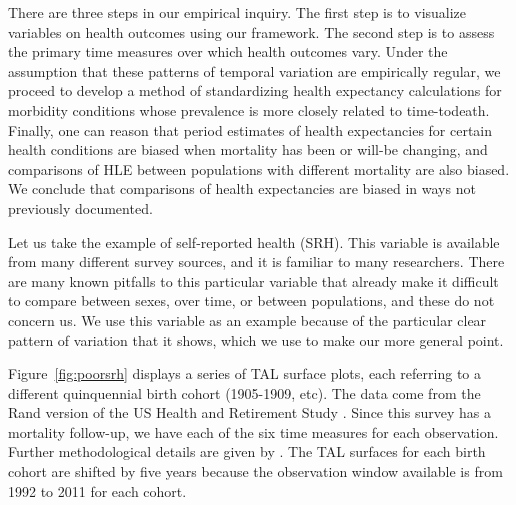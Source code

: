\documentclass[12pt,oneside,a4paper]{article} %
\begin{document}
There are three steps in our empirical inquiry. The first step is to visualize
variables on health outcomes using our framework. The second step is to
assess the primary time measures over which health outcomes vary. Under the
assumption that these patterns of temporal variation are empirically regular,
we proceed to develop a method of standardizing health expectancy calculations
for morbidity conditions whose prevalence is more closely related
to time-todeath.
Finally, one can reason that period estimates of health expectancies for certain
health conditions are biased when mortality has been or will-be changing, and
comparisons of HLE between populations with different mortality are also biased.
We conclude that comparisons of health expectancies are biased in ways not
previously documented.

Let us take the example of self-reported health (SRH). This variable is
available from many different survey sources, and it is familiar to many researchers. There are
many known pitfalls to this particular variable that already make it difficult
to compare between sexes, over time, or between populations, and these do not
concern us. We use this variable as an example because of the particular clear
pattern of variation that it shows, which we use to make our more general point.

Figure~\ref{fig:poorsrh} displays a series of TAL surface plots, each referring
to a different quinquennial birth cohort (1905-1909, etc). The data come from
the Rand version of the US Health and Retirement Study \citep{HRS}. Since this
survey has a mortality follow-up, we have each of the six
time measures for each observation. Further methodological details are given by \citet{riffe2015ttd}. The TAL surfaces for each birth
cohort are shifted by five years because the observation window available is
from 1992 to 2011 for each cohort.
\end{document}
